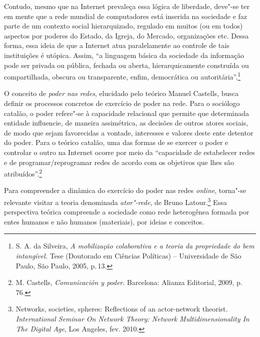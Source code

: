 Contudo, mesmo que na Internet prevaleça essa lógica de liberdade,
deve"-se ter em mente que a rede mundial de computadores está inserida na
sociedade e faz parte de um contexto social hierarquizado, regulado em
muitos (ou em todos) aspectos por poderes do Estado, da Igreja, do
Mercado, organizações etc. Dessa forma, essa ideia de que a Internet
atua paralelamente ao controle de tais instituições é utópica. Assim,
``a linguagem básica da sociedade da informação pode ser privada ou
pública, fechada ou aberta, hierarquicamente construída ou
compartilhada, obscura ou transparente, enfim, democrática ou
autoritária''.\footnote{S. A. da Silveira, \textit{A mobilização colaborativa e a
teoria da propriedade do bem intangível.} Tese (Doutorado em Ciências
Políticas) -- Universidade de São Paulo, São Paulo, 2005, p.\,13.}

O conceito de \textit{poder nas redes}, elucidado pelo teórico Manuel
Castells, busca definir os processos concretos de exercício de
poder na rede. Para o sociólogo catalão, o poder refere"-se à capacidade
relacional que permite que determinada entidade influencie, de maneira
assimétrica, as decisões de outros atores sociais, de modo que sejam
favorecidas a vontade, interesses e valores deste ente detentor do
poder. Para o teórico catalão, uma das formas de se exercer o poder e
controlar o outro na Internet ocorre por meio da ``capacidade de
estabelecer redes e de programar/reprogramar redes de acordo com os
objetivos que lhes são atribuídos''.\footnote{M. Castells, \textit{Comunicación y poder}. Barcelona: Alianza Editorial, 2009, p.\,76.}

Para compreender a dinâmica do exercício do poder nas redes \textit{online},
torna"-se relevante visitar a teoria denominada \textit{ator"-rede}, de Bruno
Latour.\footnote{Networks, societies, spheres: Reflections of an
actor-network theorist. \textit{International Seminar On Network Theory:
Network Multidimensionality In The Digital Age}, Los Angeles, fev. 2010.} Essa perspectiva teórica compreende a sociedade como rede
heterogênea formada por entes humanos e não humanos (materiais), por
ideias e conceitos.


